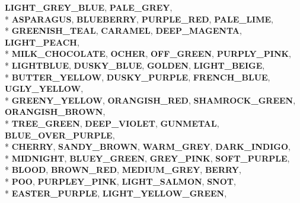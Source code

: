 \begin{DoxyCompactItemize}
{\bfseries L\+I\+G\+H\+T\+\_\+\+G\+R\+E\+Y\+\_\+\+B\+L\+UE}, 
{\bfseries P\+A\+L\+E\+\_\+\+G\+R\+EY}, 
\\*
{\bfseries A\+S\+P\+A\+R\+A\+G\+US}, 
{\bfseries B\+L\+U\+E\+B\+E\+R\+RY}, 
{\bfseries P\+U\+R\+P\+L\+E\+\_\+\+R\+ED}, 
{\bfseries P\+A\+L\+E\+\_\+\+L\+I\+ME}, 
\\*
{\bfseries G\+R\+E\+E\+N\+I\+S\+H\+\_\+\+T\+E\+AL}, 
{\bfseries C\+A\+R\+A\+M\+EL}, 
{\bfseries D\+E\+E\+P\+\_\+\+M\+A\+G\+E\+N\+TA}, 
{\bfseries L\+I\+G\+H\+T\+\_\+\+P\+E\+A\+CH}, 
\\*
{\bfseries M\+I\+L\+K\+\_\+\+C\+H\+O\+C\+O\+L\+A\+TE}, 
{\bfseries O\+C\+H\+ER}, 
{\bfseries O\+F\+F\+\_\+\+G\+R\+E\+EN}, 
{\bfseries P\+U\+R\+P\+L\+Y\+\_\+\+P\+I\+NK}, 
\\*
{\bfseries L\+I\+G\+H\+T\+B\+L\+UE}, 
{\bfseries D\+U\+S\+K\+Y\+\_\+\+B\+L\+UE}, 
{\bfseries G\+O\+L\+D\+EN}, 
{\bfseries L\+I\+G\+H\+T\+\_\+\+B\+E\+I\+GE}, 
\\*
{\bfseries B\+U\+T\+T\+E\+R\+\_\+\+Y\+E\+L\+L\+OW}, 
{\bfseries D\+U\+S\+K\+Y\+\_\+\+P\+U\+R\+P\+LE}, 
{\bfseries F\+R\+E\+N\+C\+H\+\_\+\+B\+L\+UE}, 
{\bfseries U\+G\+L\+Y\+\_\+\+Y\+E\+L\+L\+OW}, 
\\*
{\bfseries G\+R\+E\+E\+N\+Y\+\_\+\+Y\+E\+L\+L\+OW}, 
{\bfseries O\+R\+A\+N\+G\+I\+S\+H\+\_\+\+R\+ED}, 
{\bfseries S\+H\+A\+M\+R\+O\+C\+K\+\_\+\+G\+R\+E\+EN}, 
{\bfseries O\+R\+A\+N\+G\+I\+S\+H\+\_\+\+B\+R\+O\+WN}, 
\\*
{\bfseries T\+R\+E\+E\+\_\+\+G\+R\+E\+EN}, 
{\bfseries D\+E\+E\+P\+\_\+\+V\+I\+O\+L\+ET}, 
{\bfseries G\+U\+N\+M\+E\+T\+AL}, 
{\bfseries B\+L\+U\+E\+\_\+\+O\+V\+E\+R\+\_\+\+P\+U\+R\+P\+LE}, 
\\*
{\bfseries C\+H\+E\+R\+RY}, 
{\bfseries S\+A\+N\+D\+Y\+\_\+\+B\+R\+O\+WN}, 
{\bfseries W\+A\+R\+M\+\_\+\+G\+R\+EY}, 
{\bfseries D\+A\+R\+K\+\_\+\+I\+N\+D\+I\+GO}, 
\\*
{\bfseries M\+I\+D\+N\+I\+G\+HT}, 
{\bfseries B\+L\+U\+E\+Y\+\_\+\+G\+R\+E\+EN}, 
{\bfseries G\+R\+E\+Y\+\_\+\+P\+I\+NK}, 
{\bfseries S\+O\+F\+T\+\_\+\+P\+U\+R\+P\+LE}, 
\\*
{\bfseries B\+L\+O\+OD}, 
{\bfseries B\+R\+O\+W\+N\+\_\+\+R\+ED}, 
{\bfseries M\+E\+D\+I\+U\+M\+\_\+\+G\+R\+EY}, 
{\bfseries B\+E\+R\+RY}, 
\\*
{\bfseries P\+OO}, 
{\bfseries P\+U\+R\+P\+L\+E\+Y\+\_\+\+P\+I\+NK}, 
{\bfseries L\+I\+G\+H\+T\+\_\+\+S\+A\+L\+M\+ON}, 
{\bfseries S\+N\+OT}, 
\\*
{\bfseries E\+A\+S\+T\+E\+R\+\_\+\+P\+U\+R\+P\+LE}, 
{\bfseries L\+I\+G\+H\+T\+\_\+\+Y\+E\+L\+L\+O\+W\+\_\+\+G\+R\+E\+EN}, 

\end{DoxyCompactItemize}
